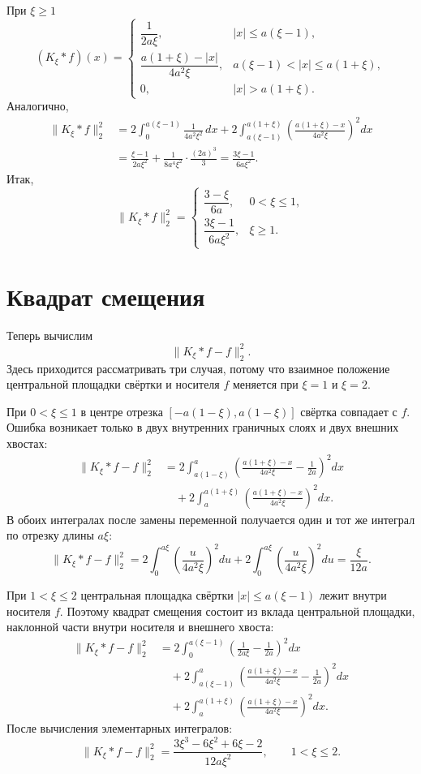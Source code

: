 \documentclass[12pt,a4paper]{article}
\begin{document}
При $\xi\ge 1$
\[
(K_\xi*f)(x)=
\begin{cases}
\dfrac{1}{2a\xi}, & |x|\le a(\xi-1),\\[6pt]
\dfrac{a(1+\xi)-|x|}{4a^2\xi},
& a(\xi-1)<|x|\le a(1+\xi),\\[6pt]
0, & |x|>a(1+\xi).
\end{cases}
\]
Аналогично,
\[
\begin{aligned}
\|K_\xi*f\|_2^2
&=2\int_0^{a(\xi-1)}\frac{1}{4a^2\xi^2}\,dx
+2\int_{a(\xi-1)}^{a(1+\xi)}
\left(\frac{a(1+\xi)-x}{4a^2\xi}\right)^2 dx\\
&=\frac{\xi-1}{2a\xi^2}
+\frac{1}{8a^4\xi^2}\cdot\frac{(2a)^3}{3}
=\frac{3\xi-1}{6a\xi^2}.
\end{aligned}
\]
Итак,
\[
\|K_\xi*f\|_2^2=
\begin{cases}
\dfrac{3-\xi}{6a}, & 0<\xi\le 1,\\[6pt]
\dfrac{3\xi-1}{6a\xi^2}, & \xi\ge 1.
\end{cases}
\]

\section*{Квадрат смещения}

Теперь вычислим
\[
\|K_\xi*f-f\|_2^2.
\]
Здесь приходится рассматривать три случая, потому что взаимное положение
центральной площадки свёртки и носителя $f$ меняется при $\xi=1$ и
$\xi=2$.

При $0<\xi\le 1$ в центре отрезка $[-a(1-\xi),a(1-\xi)]$ свёртка совпадает
с $f$. Ошибка возникает только в двух внутренних граничных слоях и двух
внешних хвостах:
\[
\begin{aligned}
\|K_\xi*f-f\|_2^2
&=2\int_{a(1-\xi)}^{a}
\left(
\frac{a(1+\xi)-x}{4a^2\xi}-\frac{1}{2a}
\right)^2 dx\\
&\quad
+2\int_{a}^{a(1+\xi)}
\left(\frac{a(1+\xi)-x}{4a^2\xi}\right)^2 dx.
\end{aligned}
\]
В обоих интегралах после замены переменной получается один и тот же
интеграл по отрезку длины $a\xi$:
\[
\|K_\xi*f-f\|_2^2
=2\int_0^{a\xi}\left(\frac{u}{4a^2\xi}\right)^2du
+2\int_0^{a\xi}\left(\frac{u}{4a^2\xi}\right)^2du
=\frac{\xi}{12a}.
\]

При $1<\xi\le 2$ центральная площадка свёртки
$|x|\le a(\xi-1)$ лежит внутри носителя $f$. Поэтому квадрат смещения
состоит из вклада центральной площадки, наклонной части внутри носителя и
внешнего хвоста:
\[
\begin{aligned}
\|K_\xi*f-f\|_2^2
&=2\int_0^{a(\xi-1)}
\left(\frac{1}{2a\xi}-\frac{1}{2a}\right)^2dx\\
&\quad
+2\int_{a(\xi-1)}^{a}
\left(
\frac{a(1+\xi)-x}{4a^2\xi}-\frac{1}{2a}
\right)^2dx\\
&\quad
+2\int_a^{a(1+\xi)}
\left(\frac{a(1+\xi)-x}{4a^2\xi}\right)^2dx.
\end{aligned}
\]
После вычисления элементарных интегралов:
\[
\|K_\xi*f-f\|_2^2
=\frac{3\xi^3-6\xi^2+6\xi-2}{12a\xi^2},
\qquad 1<\xi\le 2.
\]
\end{document}
